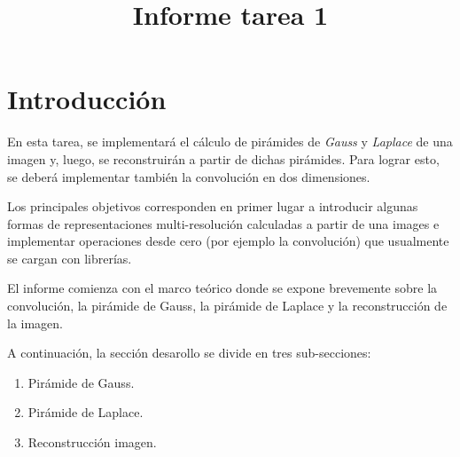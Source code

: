 \documentclass[12pt, letterpaper]{article}
\title{Informe tarea 1} %
\begin{document}


\setcounter{page}{1}
\tableofcontents 
\newpage
\listoffigures
\listoftables
\lstlistoflistings


\newpage
{}
\setcounter{page}{1}

\newpage
\section{Introducción}

\par En esta tarea, se implementará el cálculo de pirámides de \textit{Gauss} y \textit{Laplace} de una imagen y, luego, se reconstruirán a partir de dichas pirámides. Para lograr esto, se deberá implementar también la convolución en dos dimensiones. 
\par Los principales objetivos corresponden en primer lugar a introducir algunas formas de representaciones multi-resolución calculadas a partir de una images e implementar operaciones desde cero (por ejemplo la convolución) que usualmente se cargan con librerías. 

\bigskip

\par El informe comienza con el marco teórico donde se expone brevemente sobre la convolución, la pirámide de Gauss, la pirámide de Laplace y la reconstrucción de la imagen. 

\par A continuación, la sección desarollo se divide en tres sub-secciones:
\begin{enumerate}
  \item Pirámide de Gauss.
  \item Pirámide de Laplace.
  \item Reconstrucción imagen. 
\end{enumerate}
\end{document}
